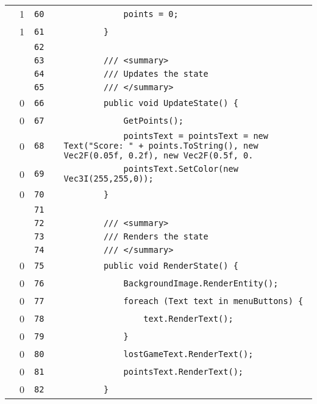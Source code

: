 \documentclass[a4paper,landscape,10pt]{article}
\begin{document}
\begin{longtable}[l]{lrrll}
\cellcolor{green} & 1 & \verb~60~ & & \verb~            points = 0;~\\
\cellcolor{green} & 1 & \verb~61~ & & \verb~        }~\\
\cellcolor{gray} &  & \verb~62~ & & \verb~~\\
\cellcolor{gray} &  & \verb~63~ & & \verb~        /// <summary>~\\
\cellcolor{gray} &  & \verb~64~ & & \verb~        /// Updates the state~\\
\cellcolor{gray} &  & \verb~65~ & & \verb~        /// </summary>~\\
\cellcolor{red} & 0 & \verb~66~ & & \verb~        public void UpdateState() {~\\
\cellcolor{red} & 0 & \verb~67~ & & \verb~            GetPoints();~\\
\cellcolor{red} & 0 & \verb~68~ & & \verb~            pointsText = pointsText = new Text("Score: " + points.ToString(), new Vec2F(0.05f, 0.2f), new Vec2F(0.5f, 0.~\\
\cellcolor{red} & 0 & \verb~69~ & & \verb~            pointsText.SetColor(new Vec3I(255,255,0));~\\
\cellcolor{red} & 0 & \verb~70~ & & \verb~        }~\\
\cellcolor{gray} &  & \verb~71~ & & \verb~~\\
\cellcolor{gray} &  & \verb~72~ & & \verb~        /// <summary>~\\
\cellcolor{gray} &  & \verb~73~ & & \verb~        /// Renders the state~\\
\cellcolor{gray} &  & \verb~74~ & & \verb~        /// </summary>~\\
\cellcolor{red} & 0 & \verb~75~ & & \verb~        public void RenderState() {~\\
\cellcolor{red} & 0 & \verb~76~ & & \verb~            BackgroundImage.RenderEntity();~\\
\cellcolor{red} & 0 & \verb~77~ & & \verb~            foreach (Text text in menuButtons) {~\\
\cellcolor{red} & 0 & \verb~78~ & & \verb~                text.RenderText();~\\
\cellcolor{red} & 0 & \verb~79~ & & \verb~            }~\\
\cellcolor{red} & 0 & \verb~80~ & & \verb~            lostGameText.RenderText();~\\
\cellcolor{red} & 0 & \verb~81~ & & \verb~            pointsText.RenderText();~\\
\cellcolor{red} & 0 & \verb~82~ & & \verb~        }~\\

\end{longtable}
\end{document}
